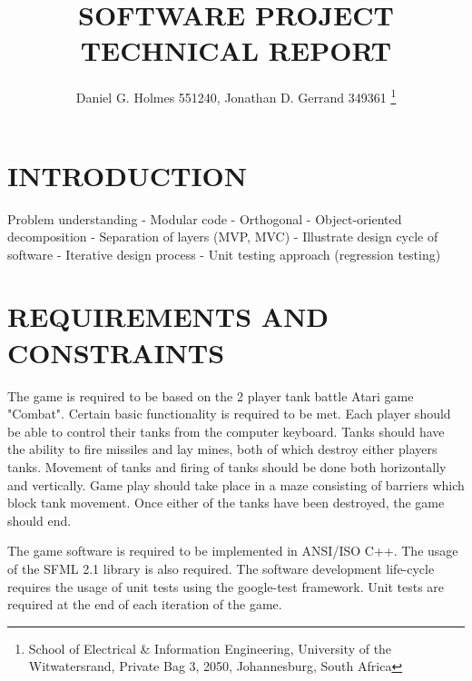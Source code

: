 \documentclass[10pt,twocolumn]{witseiepaper}
\begin{document}
\title{SOFTWARE PROJECT TECHNICAL REPORT}

\author{Daniel G. Holmes 551240, Jonathan D. Gerrand 349361
\thanks{School of Electrical \& Information Engineering, University of the
Witwatersrand, Private Bag 3, 2050, Johannesburg, South Africa}
}

%



\maketitle
\thispagestyle{empty}\pagestyle{empty}


%
\section{INTRODUCTION}%


Problem understanding
- Modular code
- Orthogonal
- Object-oriented decomposition
- Separation of layers (MVP, MVC)
- Illustrate design cycle of software
- Iterative design process
- Unit testing approach (regression testing)

%
\section{REQUIREMENTS AND CONSTRAINTS}%
The game is required to be based on the 2 player tank battle Atari game "Combat". Certain basic functionality is required to be met. Each player should be able to control their tanks from the computer keyboard. Tanks should have the ability to fire missiles and lay mines, both of which destroy either players tanks. Movement of tanks and firing of tanks should be done both horizontally and vertically. Game play should take place in a maze consisting of barriers which block tank movement. Once either of the tanks have been destroyed, the game should end.

The game software is required to be implemented in ANSI/ISO C++. The usage of the SFML 2.1 library is also required. The software development life-cycle requires the usage of unit tests using the google-test framework. Unit tests are required at the end of each iteration of the game.
\end{document}

